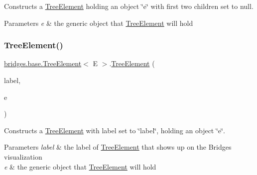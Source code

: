 Constructs a \hyperlink{classbridges_1_1base_1_1_tree_element}{Tree\+Element} holding an object \char`\"{}e\char`\"{} with first two children set to null.


\begin{DoxyParams}{Parameters}
{\em e} & the generic object that \hyperlink{classbridges_1_1base_1_1_tree_element}{Tree\+Element} will hold \\
\hline
\end{DoxyParams}
\mbox{\label{classbridges_1_1base_1_1_tree_element_a476cbeedf2c56f6a40a632035b7d740e}} 
\subsubsection{\texorpdfstring{Tree\+Element()}{TreeElement()}\hspace{0.1cm}{\footnotesize\ttfamily [3/5]}}
{\footnotesize\ttfamily \hyperlink{classbridges_1_1base_1_1_tree_element}{bridges.\+base.\+Tree\+Element}$<$ E $>$.\hyperlink{classbridges_1_1base_1_1_tree_element}{Tree\+Element} (\begin{DoxyParamCaption}\item[{String}]{label,  }\item[{E}]{e }\end{DoxyParamCaption})}

Constructs a \hyperlink{classbridges_1_1base_1_1_tree_element}{Tree\+Element} with label set to \char`\"{}label\char`\"{}, holding an object \char`\"{}e\char`\"{}. 
\begin{DoxyParams}{Parameters}
{\em label} & the label of \hyperlink{classbridges_1_1base_1_1_tree_element}{Tree\+Element} that shows up on the Bridges visualization \\
\hline
{\em e} & the generic object that \hyperlink{classbridges_1_1base_1_1_tree_element}{Tree\+Element} will hold \\
\hline
\end{DoxyParams}
\mbox{\label{classbridges_1_1base_1_1_tree_element_aae24dfde287dc0596c69ad853f12f72e}} 
